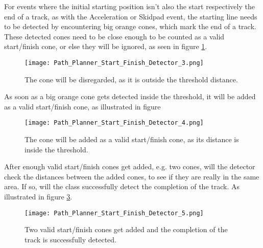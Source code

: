 For events where the initial starting position isn't also the start respectively the end of a track, as with the Acceleration or Skidpad event, the starting line needs to be detected by encountering big orange cones, which mark the end of a track. These detected cones need to be close enough to be counted as a valid start/finish cone, or else they will be ignored, as seen in figure \ref{fig:Path Planner Start Finish Detector 3}.
\begin{figure}[H]
    \centering
    \texttt{[image: Path\_Planner\_Start\_Finish\_Detector\_3.png]}
    \caption{The cone will be disregarded, as it is outside the threshold distance.}
    \label{fig:Path Planner Start Finish Detector 3}
\end{figure}
As soon as a big orange cone gets detected inside the threshold, it will be added as a valid start/finish cone, as illustrated in figure
\begin{figure}[H]
    \centering
    \texttt{[image: Path\_Planner\_Start\_Finish\_Detector\_4.png]}
    \caption{The cone will be added as a valid start/finish cone, as its distance is inside the threshold.}
    \label{fig:Path Planner Start Finish Detector 4}
\end{figure}
After enough valid start/finish cones get added, e.g. two cones, will the detector check the distances between the added cones, to see if they are really in the same area. If so, will the class successfully detect the completion of the track. As illustrated in figure \ref{fig:Path Planner Start Finish Detector 5}.
\begin{figure}[H]
    \centering
    \texttt{[image: Path\_Planner\_Start\_Finish\_Detector\_5.png]}
    \caption{Two valid start/finish cones get added and the completion of the track is successfully detected.}
    \label{fig:Path Planner Start Finish Detector 5}
\end{figure}

